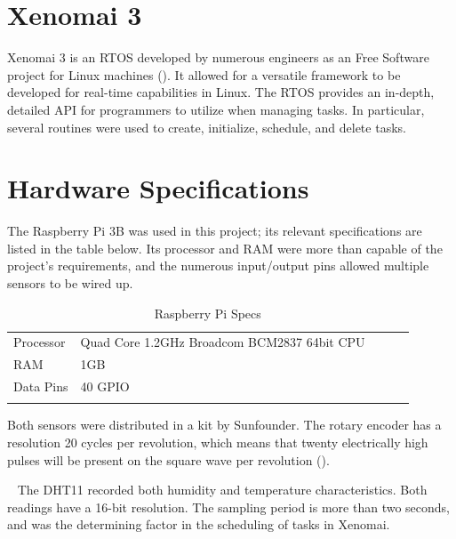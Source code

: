 \documentclass[letterpaper, 12pt]{article}
\begin{document}
\section{Xenomai 3}
Xenomai 3 is an RTOS developed by numerous engineers as an Free Software project for Linux machines (\cite{xenomai2018}).  It allowed for a versatile framework to be developed for real-time capabilities in Linux.  The RTOS provides an in-depth, detailed API for programmers to utilize when managing tasks.  In particular, several routines were used to create, initialize, schedule, and delete tasks. %
~\newpage
\section{Hardware Specifications}
The Raspberry Pi 3B was used in this project; its relevant specifications are listed in the table below.  Its processor and RAM were more than capable of the project's requirements, and the numerous input/output pins allowed multiple sensors to be wired up.
~\newline
\begin{table}[hbt]
	\centering
	\caption{Raspberry Pi Specs}
	\label{my-label}
	\begin{tabular}{lllll}
		\cline{1-2}
		\multicolumn{1}{|l|}{Processor} & \multicolumn{1}{l|}{Quad Core 1.2GHz Broadcom BCM2837 64bit CPU} &  &  &  \\ \cline{1-2}
		\multicolumn{1}{|l|}{RAM} & \multicolumn{1}{l|}{1GB} &  &  &  \\ \cline{1-2}
		\multicolumn{1}{|l|}{Data Pins} & \multicolumn{1}{l|}{40 GPIO} &  &  &  \\ \cline{1-2}
		&                       &  &  & 
	\end{tabular}
\end{table}

Both sensors were distributed in a kit by Sunfounder.  The rotary encoder has a resolution 20 cycles per revolution, which means that twenty electrically high pulses will be present on the square wave per revolution (\cite{artofcircuits2018}).  

~\newline
The DHT11 recorded both humidity and temperature characteristics.  Both readings have a 16-bit resolution.  The sampling period is more than two seconds, and was the determining factor in the scheduling of tasks in Xenomai.
\end{document}
